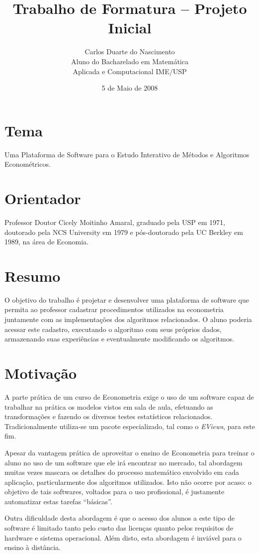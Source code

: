 \documentclass[11pt]{article}
\title{Trabalho de Formatura -- Projeto Inicial}
\author{Carlos Duarte do Nascimento\\Aluno do Bacharelado em Matemática\\Aplicada e Computacional IME/USP}
\date{5 de Maio de 2008}
\begin{document}
\maketitle

\section {Tema}
Uma Plataforma de Software para o Estudo Interativo de Métodos e Algoritmos Econométricos.

\section {Orientador}
Professor Doutor Cicely Moitinho Amaral, graduado pela USP em 1971, doutorado pela NCS University em 1979 e pós-doutorado pela UC Berkley em 1989, na área de Economia.

\section {Resumo}
O objetivo do trabalho é projetar e desenvolver uma plataforma de software que permita ao professor cadastrar procedimentos utilizados na econometria juntamente com as implementações dos algoritmos relacionados. O aluno poderia acessar este cadastro, executando o algoritmo com seus próprios dados, armazenando suas experiências e eventualmente modificando os algoritmos.

\section {Motivação}
A parte prática de um curso de Econometria exige o uso de um software capaz de trabalhar na prática os modelos vistos em sala de aula, efetuando as transformações e fazendo os diversos testes estatísticos relacionados. Tradicionalmente utiliza-se um pacote especializado, tal como o {\em EViews}, para este fim. 

Apesar da vantagem prática de aproveitar o ensino de Econometria para treinar o aluno no uso de um software que ele irá encontrar no mercado, tal abordagem muitas vezes mascara os detalhes do processo matemático envolvido em cada aplicação, particularmente dos algoritmos utilizados. Isto não ocorre por acaso: o objetivo de tais softwares, voltados para o uso profissional, é justamente automatizar estas tarefas “básicas”.

Outra dificuldade desta abordagem é que o acesso dos alunos a este tipo de software é limitado tanto pelo custo das licenças quanto pelos requisitos de hardware e sistema operacional. Além disto, esta abordagem é inviável para o ensino à distância.
\end{document}
